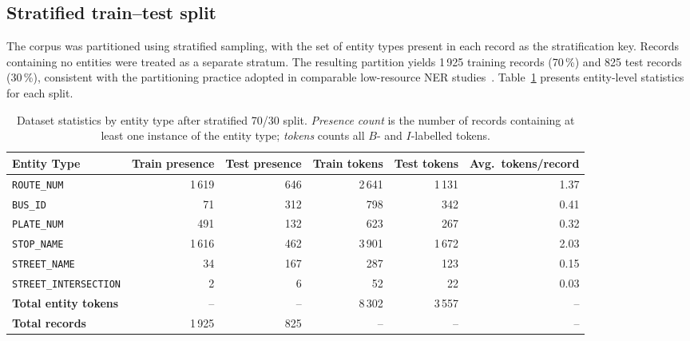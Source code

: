 \subsection{Stratified train--test split}
\label{sec:split}

The corpus was partitioned using stratified sampling, with the set of entity types present in each record as the stratification key. Records containing no entities were treated as a separate stratum. The resulting partition yields 1\,925 training records (70\,\%) and 825 test records (30\,\%), consistent with the partitioning practice adopted in comparable low-resource NER studies~\cite{tarannum2026address,kassab2025russian}. Table~\ref{tab:dataset} presents entity-level statistics for each split.

\begin{table}[H]
\centering
\caption{Dataset statistics by entity type after stratified 70/30 split. \emph{Presence count} is the number of records containing at least one instance of the entity type; \emph{tokens} counts all $B$- and $I$-labelled tokens.}
\label{tab:dataset}
\renewcommand{\arraystretch}{1.3}
\begin{tabular}{lrrrrr}
\toprule
\textbf{Entity Type}
  & \textbf{Train presence}
  & \textbf{Test presence}
  & \textbf{Train tokens}
  & \textbf{Test tokens}
  & \textbf{Avg.\ tokens/record} \\
\midrule
\texttt{ROUTE\_NUM}           & 1\,619 & 646 & 2\,641 & 1\,131 & 1.37 \\
\texttt{BUS\_ID}              &    71  & 312 &   798  &   342  & 0.41 \\
\texttt{PLATE\_NUM}           &   491  & 132 &   623  &   267  & 0.32 \\
\texttt{STOP\_NAME}           & 1\,616 & 462 & 3\,901 & 1\,672 & 2.03 \\
\texttt{STREET\_NAME}         &    34  & 167 &   287  &   123  & 0.15 \\
\texttt{STREET\_INTERSECTION} &     2  &   6 &    52  &    22  & 0.03 \\
\midrule
\textbf{Total entity tokens}  & --     & --  & 8\,302 & 3\,557 & --   \\
\textbf{Total records}        & 1\,925 & 825 & --     & --     & --   \\
\bottomrule
\end{tabular}
\end{table}

